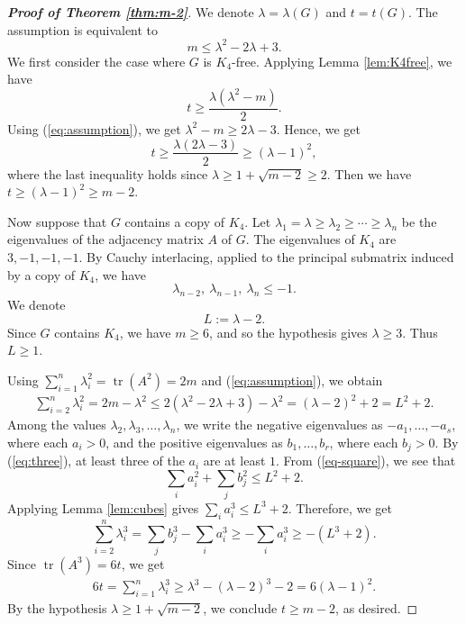 \documentclass[10pt,a4paper]{amsart}
\newcommand{\tr}{\operatorname{tr}}
\renewcommand{\le}{\leqslant}
\renewcommand{\ge}{\geqslant}
\begin{document}
\begin{proof}[{\bf Proof of Theorem \ref{thm:m-2}}]
We denote $ \lambda=\lambda(G)$ and $t=t(G)$. 
The assumption is equivalent to 
\begin{equation} \label{eq:assumption}
        m\le \lambda^2-2\lambda+3.
\end{equation} 
We first consider the case where $G$ is $K_4$-free.  Applying Lemma
\ref{lem:K4free}, we have 
\[
        t \ge \frac{\lambda(\lambda^2-m)}{2}.
\]
Using (\ref{eq:assumption}), we get
$\lambda^2-m\ge 2\lambda-3$. 
Hence, we get 
\[
        t\ge \frac{\lambda(2\lambda-3)}{2} 
        \ge (\lambda -1)^2,
\]
where the last inequality holds since $\lambda \ge 1+ \sqrt{m-2} \ge 2$. 
Then we have $ t\ge (\lambda-1)^2\ge m-2$. 

Now suppose that $G$ contains a copy of $K_4$.  Let $ \lambda_1=\lambda\ge \lambda_2\ge \cdots\ge \lambda_n$ be the eigenvalues of the
adjacency matrix $A$ of $G$. 
The eigenvalues of $K_4$ are $3,-1,-1,-1$.  By Cauchy interlacing, applied to
the principal submatrix induced by a copy of $K_4$, we have
\begin{equation} \label{eq:three}
        \lambda_{n-2},\ \lambda_{n-1},\ \lambda_n\le -1.
\end{equation}
We denote  
\[
        L:=\lambda-2.
\]
Since $G$ contains $K_4$, we have $m\ge 6$, and so the hypothesis gives
$\lambda\ge 3$.  Thus $L\ge 1$.

Using $\sum_{i=1}^n \lambda_i^2=\tr(A^2)=2m$ and (\ref{eq:assumption}), we obtain
\begin{equation} \label{eq-square}
\begin{aligned}
        \sum_{i=2}^n\lambda_i^2
        =2m-\lambda^2                           \le 2(\lambda^2-2\lambda+3)-\lambda^2   =(\lambda-2)^2+2                        =L^2+2.
\end{aligned}
\end{equation}
Among the values $\lambda_2,\lambda_3,\ldots ,\lambda_n$, 
we write the negative eigenvalues as 
$ -a_1,\dots,-a_s$, where each $a_i>0$, 
and the positive eigenvalues as 
$ b_1,\dots,b_r$, where each $b_j>0$. 
By (\ref{eq:three}), at least three of the $a_i$ are at least $1$.  From (\ref{eq-square}), we see that  
\[
        \sum_i a_i^2+\sum_j b_j^2\le L^2+2.
\]
Applying Lemma \ref{lem:cubes} gives
$  \sum_{i} a_i^3\le L^3+2$. 
Therefore, we get 
\[
        \sum_{i=2}^n\lambda_i^3 
        =
        \sum_j b_j^3-\sum_i a_i^3
        \ge -\sum_i a_i^3 \ge 
        -(L^3+2).
\]
Since $\tr(A^3)=6t$, we get
\[
\begin{aligned}
        6t
        =\sum_{i=1}^n\lambda_i^3                \ge \lambda^3-(\lambda-2)^3-2       =6(\lambda-1)^2.
\end{aligned}
\]
By the hypothesis $\lambda \ge 1+ \sqrt{m-2}$, we conclude $ t\ge m-2$, as desired. 


\end{proof}
\end{document}
